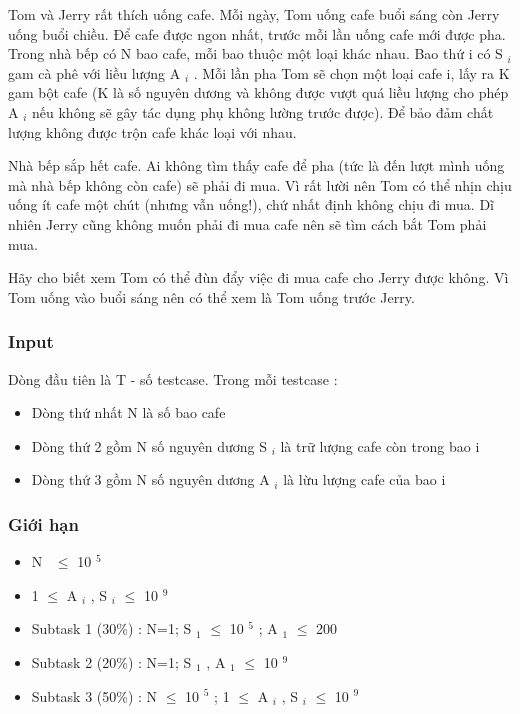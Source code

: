 

Tom và Jerry rất thích uống cafe. Mỗi ngày, Tom uống cafe buổi sáng còn Jerry uống buổi chiều. Để cafe được ngon nhất, trước mỗi lần uống cafe mới được pha. Trong nhà bếp có N bao cafe, mỗi bao thuộc một loại khác nhau. Bao thứ i có S $_ i $ gam cà phê với liều lượng A $_ i $ . Mỗi lần pha Tom sẽ chọn một loại cafe i, lấy ra K gam bột cafe (K là số nguyên dương và không được vượt quá liều lượng cho phép A $_ i $ nếu không sẽ gây tác dụng phụ không lường trước được). Để bảo đảm chất lượng không được trộn cafe khác loại với nhau.

Nhà bếp sắp hết cafe. Ai không tìm thấy cafe để pha (tức là đến lượt mình uống mà nhà bếp không còn cafe) sẽ phải đi mua. Vì rất lười nên Tom có thể nhịn chịu uống ít cafe một chút (nhưng vẫn uống!), chứ nhất định không chịu đi mua. Dĩ nhiên Jerry cũng không muốn phải đi mua cafe nên sẽ tìm cách bắt Tom phải mua.

Hãy cho biết xem Tom có thể đùn đẩy việc đi mua cafe cho Jerry được không. Vì Tom uống vào buổi sáng nên có thể xem là Tom uống trước Jerry.

\subsubsection{Input}

Dòng đầu tiên là T - số testcase. Trong mỗi testcase :
\begin{itemize}
	\item Dòng thứ nhất N là số bao cafe
	\item Dòng thứ 2 gồm N số nguyên dương S $_ i $ là trữ lượng cafe còn trong bao i
	\item Dòng thứ 3 gồm N số nguyên dương A $_ i $ là lừu lượng cafe của bao i
\end{itemize}

\subsubsection{Giới hạn}
\begin{itemize}
	\item N  $\le$  10 $^ 5 $
	\item 1  $\le$  A $_ i $ , S $_ i $  $\le$  10 $^ 9 $
	\item Subtask 1 (30\%) : N=1; S $_ 1 $  $\le$  10 $^ 5 $ ; A $_ 1 $  $\le$  200
	\item Subtask 2 (20\%) : N=1; S $_ 1 $ , A $_ 1 $  $\le$  10 $^ 9 $
	\item Subtask 3 (50\%) : N  $\le$  10 $^ 5 $ ; 1  $\le$  A $_ i $ , S $_ i $  $\le$  10 $^ 9 $
\end{itemize}

